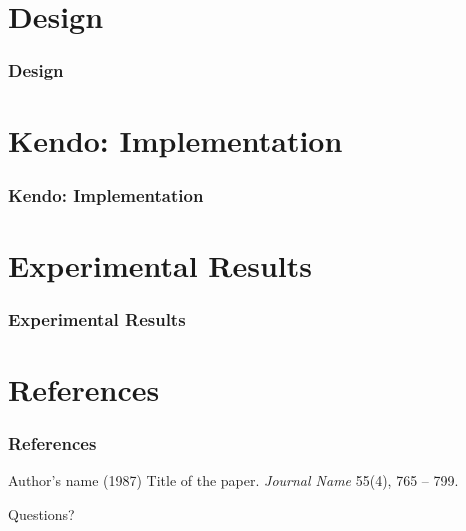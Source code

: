 \documentclass{beamer}
\begin{document}
\section{Design}
\begin{frame}
\frametitle{Design}
\end{frame}

\section{Kendo: Implementation}
\begin{frame}
\frametitle{Kendo: Implementation}
\end{frame}


\section{Experimental Results}
\begin{frame}
\frametitle{Experimental Results}
\end{frame}
\section{References}

\begin{frame}
\frametitle{References}
\footnotesize{
  \begin{thebibliography}{99}
   Author's name (1987)
    \newblock Title of the paper.
    \newblock \emph{Journal Name} 55(4), 765 -- 799.
    \end{thebibliography}
}
\end{frame}

\begin{frame}
\centerline{Questions?}
\end{frame}
\end{document}
